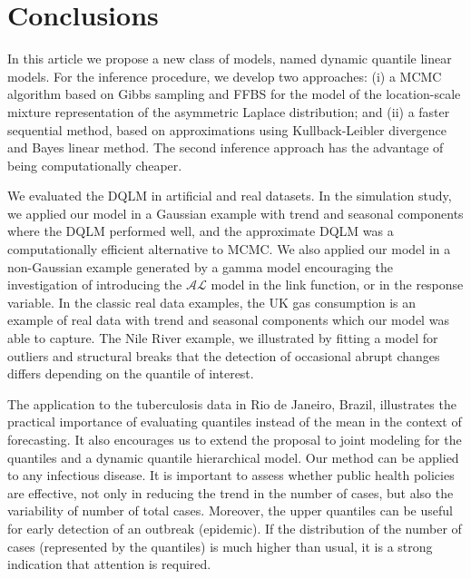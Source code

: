 \documentclass[12pt,a4paper]{article}\usepackage[]{graphicx}\usepackage[]{color}\usepackage{subfigure}
\begin{document}





\section{Conclusions} %

In this article we propose a new class of models, named dynamic quantile linear models. 
For the inference procedure, we develop two approaches: 
(i) a MCMC algorithm based on Gibbs sampling and FFBS for the model of the location-scale mixture representation of the asymmetric Laplace distribution; and (ii) a faster sequential method, based on approximations using Kullback-Leibler divergence and Bayes linear method.
The second inference approach has the advantage of being computationally cheaper.

We evaluated the DQLM in artificial and real datasets. 
In the simulation study, we applied our model in a Gaussian example with trend and seasonal components where the DQLM performed well, and the approximate DQLM was a computationally efficient alternative to MCMC.
We also applied our model in a non-Gaussian example generated by a gamma model encouraging the investigation of introducing the $\mathcal{AL}$ model in the link function, or in the response variable.
In the classic real data examples, the UK gas consumption is an example of real data with trend and seasonal components which our model was able to capture. 
The Nile River example, we illustrated by fitting a model for outliers and structural breaks that the detection of occasional abrupt changes differs depending on the quantile of interest.

The application to the tuberculosis data in Rio de Janeiro, Brazil, illustrates the practical importance of evaluating quantiles instead of the mean in the context of forecasting. 
It also encourages us to extend the proposal to joint modeling for the quantiles and a dynamic quantile hierarchical model. Our method can be applied to any infectious disease. It is important to assess whether public health policies are effective, not only in reducing the trend in the number of cases, but also the variability of number of total cases. 
Moreover, the upper quantiles can be useful for early detection of an outbreak (epidemic). 
If the distribution of the number of cases (represented by the quantiles) is much higher than usual, it is a strong indication that attention is required.
\end{document}
